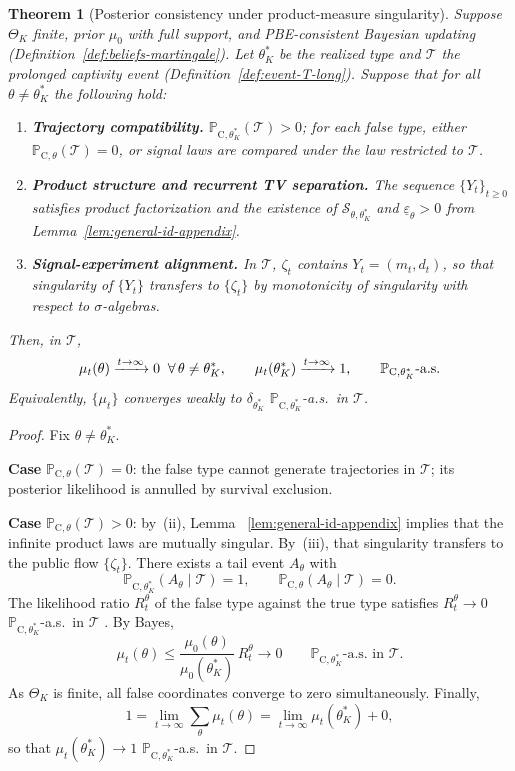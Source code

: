 \documentclass[ecta,nameyear,final,supplement]{econsocart}
\numberwithin{equation}{section}
\numberwithin{table}{section}
\newtheorem{theorem}{Theorem}[section]
\theoremstyle{definition}
\newcommand{\ProbC}[1]{\mathbb{P}_{\mathrm{C},#1}}
\begin{document}
\bigskip

\begin{theorem}[Posterior consistency under product-measure singularity]
\label{thm:posterior-consistency-appendix}
Suppose $\Theta_K$ finite, prior $\mu_0$ with full support, and PBE-consistent
Bayesian updating (Definition~\ref{def:beliefs-martingale}).
Let $\theta_K^\ast$ be the realized type and $\mathcal{T}$ the prolonged
captivity event (Definition~\ref{def:event-T-long}). Suppose that for all
$\theta\neq\theta_K^\ast$ the following hold:
\begin{enumerate}
  \item[\textup{(i)}] \textbf{Trajectory compatibility.}
  $\ProbC{\theta_K^\ast}(\mathcal{T})>0$; for each false type, either
  $\ProbC{\theta}(\mathcal{T})=0$, or signal laws are compared under the law
  restricted to $\mathcal{T}$.
  \item[\textup{(ii)}] \textbf{Product structure and recurrent TV separation.}
  The sequence $\{Y_t\}_{t\ge 0}$ satisfies product factorization and the
  existence of $\mathcal{S}_{\theta,\theta_K^\ast}$ and
  $\underline\varepsilon_\theta>0$ from Lemma~\ref{lem:general-id-appendix}.
  \item[\textup{(iii)}] \textbf{Signal-experiment alignment.}
  In $\mathcal{T}$, $\zeta_t$ contains $Y_t=(m_t,d_t)$, so that singularity of
  $\{Y_t\}$ transfers to $\{\zeta_t\}$ by monotonicity of singularity with
  respect to $\sigma$-algebras.
\end{enumerate}
Then, in $\mathcal{T}$,
\[
\mu_t(\theta)\xrightarrow{t\to\infty}0\;\;\forall\,\theta\neq\theta_K^\ast,
\qquad
\mu_t(\theta_K^\ast)\xrightarrow{t\to\infty}1,
\qquad\ProbC{\theta_K^\ast}\textup{-a.s.}
\]
Equivalently, $\{\mu_t\}$ converges weakly to $\delta_{\theta_K^\ast}$
$\ProbC{\theta_K^\ast}$-a.s.\ in $\mathcal{T}$.
\end{theorem}

\begin{proof}
Fix $\theta\neq\theta_K^\ast$.

\textbf{Case} $\ProbC{\theta}(\mathcal{T})=0$: the false type cannot generate
trajectories in $\mathcal{T}$; its posterior likelihood is annulled by survival
exclusion.

\textbf{Case} $\ProbC{\theta}(\mathcal{T})>0$: by~(ii), Lemma
~\ref{lem:general-id-appendix} implies that the infinite product laws are
mutually singular. By~(iii), that singularity transfers to the public flow
$\{\zeta_t\}$. There exists a tail event $A_\theta$ with
\[
\ProbC{\theta_K^\ast}(A_\theta\mid\mathcal{T})=1,\qquad
\ProbC{\theta}(A_\theta\mid\mathcal{T})=0.
\]
The likelihood ratio $R_t^\theta$ of the false type against the true type
satisfies $R_t^\theta\to 0$ $\ProbC{\theta_K^\ast}$-a.s.\ in $\mathcal{T}$
\citep{BlackwellDubins1962,Schervish1995Theory}. By Bayes,
\[
\mu_t(\theta)
\le\frac{\mu_0(\theta)}{\mu_0(\theta_K^\ast)}\,R_t^\theta\to 0
\qquad\ProbC{\theta_K^\ast}\text{-a.s.\ in }\mathcal{T}.
\]
As $\Theta_K$ is finite, all false coordinates converge to zero
simultaneously. Finally,
\[
1=\lim_{t\to\infty}\sum_\theta\mu_t(\theta)
=\lim_{t\to\infty}\mu_t(\theta_K^\ast)+0,
\]
so that $\mu_t(\theta_K^\ast)\to 1$ $\ProbC{\theta_K^\ast}$-a.s.\ in
$\mathcal{T}$.
\end{proof}
\end{document}
